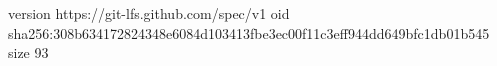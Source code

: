 version https://git-lfs.github.com/spec/v1
oid sha256:308b634172824348e6084d103413fbe3ec00f11c3eff944dd649bfc1db01b545
size 93

